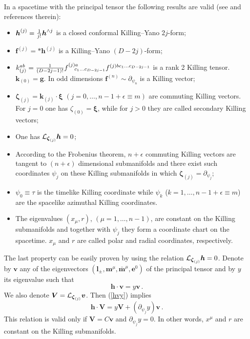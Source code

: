 \documentclass[superscriptaddress,twocolumn,showpacs,
preprintnumbers,amsmath,amssymb,nofootinbib,
longbibliography,aps,prd,10pt]{revtex4-1}
\newcommand{\ts}[1]{{\boldsymbol{#1}}}         %
\newcommand{\be}{\begin{equation}}             %
\newcommand{\ee}{\end{equation}}               %
\newcommand{\n}[1]{\label{#1}}
\begin{document}
In a spacetime with the principal tensor the following results are valid (see \cite{Frolov:2017kze} and references therein):
\begin{itemize}
\item $\ts{h}^{(j)}={1\over j!}\ts{h}^{\wedge j}$ is a closed conformal Killing--Yano $2j$-form;
\item $\ts{f}^{(j)}=* \ts{h}^{(j)}$ is a Killing--Yano $(D-2j)$-form;
\item $k_{(j)}^{ab}={1\over (D-2j-1)!} f^{(j)a}_{\ \ \ c_1...c_{D-2j-1}}f^{(j)bc_1...c_{D-2j-1}}$ is a rank 2 Killing tensor. $\ts{k}_{(0)}=\ts{g}$. In odd dimensions $\ts{f}^{(n)}\sim \partial_{\psi_n}$ is a Killing vector;
\item $\ts{\zeta}_{(j)}=\ts{k}_{(j)}\cdot \ts{\xi} $ $(j=0,\ldots,n-1+\epsilon \equiv m)$ are commuting Killing vectors. For $j=0$ one has $\zeta_{(0)}=\ts{\xi}$, while for $j>0$ they are called secondary Killing vectors;
\item One has ${\cal L}_{\ts{\zeta}_{(j)}}\ts{h}=0$;
\item According to the Frobenius theorem, $n+\epsilon$ commuting Killing vectors are tangent to $(n+\epsilon)$ dimensional submanifolds and there exist such coordinates $\psi_j$ on these Killing submanifolds in which $\ts{\zeta}_{(j)}=\partial_{\psi_j}$;
\item $\psi_0 \equiv \tau$ is the timelike Killing coordinate while  $\psi_k$ ($k=1,\dots,n-1+\epsilon \equiv m$) are the spacelike azimuthal Killing coordinates.
\item The eigenvalues $(x_{\mu},r)$, $(\mu=1,\ldots,n-1)$, are constant on the Killing submanifolds and together with $\psi_j$ they form a coordinate chart on the spacetime. $x_{\mu}$ and $r$ are called polar and radial coordinates, respectively.
\end{itemize}

The last property can be easily proven by using the relation ${\cal L}_{\ts{\zeta}_{(j)}}\ts{h}=0$. Denote by $\ts{v}$ any of the eigenvectors $(\ts{l}_{\pm},\ts{m}^{\mu},\bar{\ts{m}}^{\mu}, \ts{e}^0)$ of the principal tensor and by $y$ its eigenvalue such that
\be\n{hvy}
\ts{h}\cdot \ts{v}=y\ts{v}\, .
\ee
We also denote $\ts{V}={\cal L}_{\ts{\zeta}_{(j)}}\ts{v}$. Then (\ref{hvy}) implies
\be
\ts{h}\cdot \ts{V}=y\ts{V}+ (\partial_{\psi_j}y) \ts{v}\, .
\ee
This relation is valid only if $\ts{V}=C\ts{v}$ and $\partial_{\psi_j}y=0$. In other words, $x^{\mu}$ and $r$ are constant on the Killing submanifolds.
\end{document}
